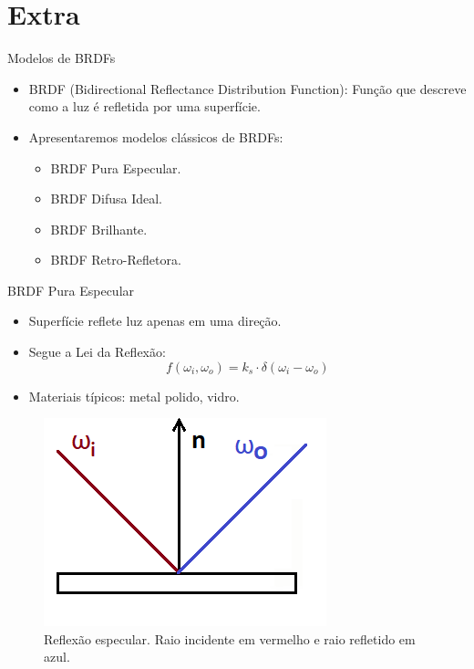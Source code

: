 \section{Extra}
\begin{frame}{Modelos de BRDFs}
    \begin{itemize}
        \item BRDF (Bidirectional Reflectance Distribution Function):  
              Função que descreve como a luz é refletida por uma superfície.
        \item Apresentaremos modelos clássicos de BRDFs:
        \begin{itemize}
            \item BRDF Pura Especular.
            \item BRDF Difusa Ideal.
            \item BRDF Brilhante.
            \item BRDF Retro-Refletora.
        \end{itemize}
    \end{itemize}
\end{frame}

\begin{frame}{BRDF Pura Especular}
    \begin{itemize}
        \item Superfície reflete luz apenas em uma direção.
        \item Segue a Lei da Reflexão:
        \[
        f(\omega_i, \omega_o) = k_s \cdot \delta(\omega_i - \omega_o)
        \]
        \item Materiais típicos: metal polido, vidro.
    \end{itemize}
    \begin{figure}[H]
        \centering
        \includegraphics[scale=0.5]{./Imagens/specular-2d.png}
        \caption{\small Reflexão especular. Raio incidente em vermelho e raio refletido em azul.}
    \end{figure}
\end{frame}

